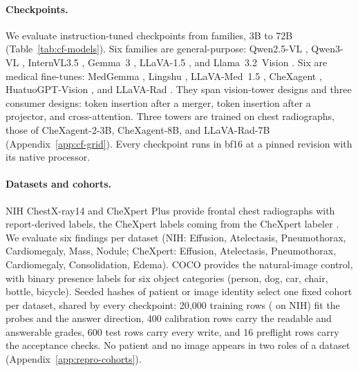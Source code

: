 \documentclass{article}
\begin{document}
\paragraph{Checkpoints.}
We evaluate \cfCheckpoints{} instruction-tuned checkpoints from \cfFamiliesWord{} families, 3B to 72B (Table~\ref{tab:cf-models}). Six families are general-purpose: Qwen2.5-VL \citep{bai2025qwen25vl}, Qwen3-VL \citep{qwen2025qwen3vl}, InternVL3.5 \citep{wang2025internvl35}, Gemma~3 \citep{gemma2025gemma3}, LLaVA-1.5 \citep{liu2024improved}, and Llama~3.2~Vision \citep{meta2024llama32vision}. Six are medical fine-tunes: MedGemma \citep{sellergren2025medgemma}, Lingshu \citep{lasa2025lingshu}, LLaVA-Med~1.5 \citep{li2023llavamed}, CheXagent \citep{chen2024chexagent}, HuatuoGPT-Vision \citep{chen2024huatuogptvision}, and LLaVA-Rad \citep{zambranochaves2025llavarad}. They span \cfTowerDesignsWord{} vision-tower designs and three consumer designs: token insertion after a merger, token insertion after a projector, and cross-attention. Three towers are trained on chest radiographs, those of CheXagent-2-3B, CheXagent-8B, and LLaVA-Rad-7B (Appendix~\ref{app:cf-grid}). Every checkpoint runs in bf16 at a pinned revision with its native processor.

\paragraph{Datasets and cohorts.}
NIH ChestX-ray14 \citep{wang2017chestxray} and CheXpert Plus \citep{chambon2024chexpertplus} provide frontal chest radiographs with report-derived labels, the CheXpert labels coming from the CheXpert labeler \citep{irvin2019chexpert}. We evaluate six findings per dataset (NIH: Effusion, Atelectasis, Pneumothorax, Cardiomegaly, Mass, Nodule; CheXpert: Effusion, Atelectasis, Pneumothorax, Cardiomegaly, Consolidation, Edema). COCO \citep{lin2014coco} provides the natural-image control, with binary presence labels for six object categories (person, dog, car, chair, bottle, bicycle). Seeded hashes of patient or image identity select one fixed cohort per dataset, shared by every checkpoint: 20{,}000 training rows (\cfCohortNihTrainRows{} on NIH) fit the probes and the answer direction, 400 calibration rows carry the readable and answerable grades, 600 test rows carry every write, and 16 preflight rows carry the acceptance checks. No patient and no image appears in two roles of a dataset (Appendix~\ref{app:repro-cohorts}).
\end{document}
